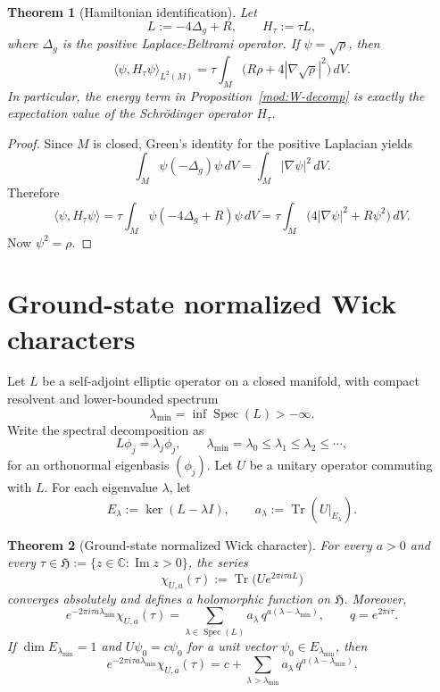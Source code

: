 \documentclass[11pt,a4paper]{article}
\numberwithin{equation}{section}
\newtheorem{theorem}{Theorem}[section]
\theoremstyle{definition}
\theoremstyle{remark}
\DeclareMathOperator{\Ima}{Im}
\newcommand{\CC}{\mathbb C}
\begin{document}
\begin{theorem}[Hamiltonian identification]\label{mod:H-identification}
Let
\[
L:=-4\Delta_g+R,
\qquad
H_\tau:=\tau L,
\]
where $\Delta_g$ is the positive Laplace-Beltrami operator.  If $\psi=\sqrt\rho$, then
\[
\langle \psi,H_\tau\psi\rangle_{L^2(M)}
=
\tau\int_M \bigl(R\rho+4|\nabla\sqrt\rho|^2\bigr)\,dV.
\]
In particular, the energy term in Proposition~\ref{mod:W-decomp} is exactly the expectation value of the Schr\"odinger operator $H_\tau$.
\end{theorem}

\begin{proof}
Since $M$ is closed, Green's identity for the positive Laplacian yields
\[
\int_M \psi(-\Delta_g)\psi\,dV
=
\int_M |\nabla\psi|^2\,dV.
\]
Therefore
\[
\langle \psi,H_\tau\psi\rangle
=
\tau\int_M \psi(-4\Delta_g+R)\psi\,dV
=
\tau\int_M \bigl(4|\nabla\psi|^2+R\psi^2\bigr)\,dV.
\]
Now $\psi^2=\rho$.
\end{proof}

\section{Ground-state normalized Wick characters}

Let $L$ be a self-adjoint elliptic operator on a closed manifold, with compact resolvent and lower-bounded spectrum
\[
\lambda_{\min}=\inf\operatorname{Spec}(L)>-\infty.
\]
Write the spectral decomposition as
\[
L\phi_j=\lambda_j\phi_j,
\qquad
\lambda_{\min}=\lambda_0\le \lambda_1\le \lambda_2\le \cdots,
\]
for an orthonormal eigenbasis $(\phi_j)$.  Let $U$ be a unitary operator commuting with $L$.  For each eigenvalue $\lambda$, let
\[
E_\lambda:=\ker(L-\lambda I),
\qquad
a_\lambda:=\operatorname{Tr}(U|_{E_\lambda}).
\]

\begin{theorem}[Ground-state normalized Wick character]\label{mod:wick-character}
For every $a>0$ and every $\tau\in\mathfrak H:=\{z\in\CC:\Ima z>0\}$, the series
\[
\chi_{U,a}(\tau):=\operatorname{Tr}\!\bigl(Ue^{2\pi i\tau aL}\bigr)
\]
converges absolutely and defines a holomorphic function on $\mathfrak H$.  Moreover,
\[
e^{-2\pi i\tau a\lambda_{\min}}\chi_{U,a}(\tau)
=
\sum_{\lambda\in\operatorname{Spec}(L)} a_\lambda\,q^{a(\lambda-\lambda_{\min})},
\qquad
q=e^{2\pi i\tau}.
\]
If $\dim E_{\lambda_{\min}}=1$ and $U\psi_0=c\psi_0$ for a unit vector $\psi_0\in E_{\lambda_{\min}}$, then
\[
e^{-2\pi i\tau a\lambda_{\min}}\chi_{U,a}(\tau)
=
c+\sum_{\lambda>\lambda_{\min}} a_\lambda\,q^{a(\lambda-\lambda_{\min})}.
\]
\end{theorem}
\end{document}
